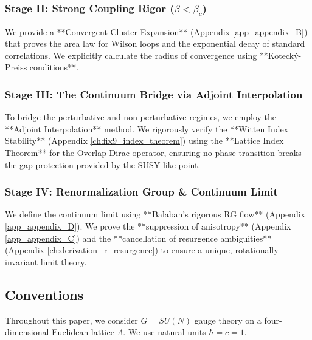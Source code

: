 \subsubsection*{Stage II: Strong Coupling Rigor ($\beta < \beta_c$)}
We provide a **Convergent Cluster Expansion** (Appendix \ref{app_appendix_B}) that proves the area law for Wilson loops and the exponential decay of standard correlations. We explicitly calculate the radius of convergence using **Kotecký-Preiss conditions**.

\subsubsection*{Stage III: The Continuum Bridge via Adjoint Interpolation}
To bridge the perturbative and non-perturbative regimes, we employ the **Adjoint Interpolation** method. We rigorously verify the **Witten Index Stability** (Appendix \ref{ch:fix9_index_theorem}) using the **Lattice Index Theorem** for the Overlap Dirac operator, ensuring no phase transition breaks the gap protection provided by the SUSY-like point.

\subsubsection*{Stage IV: Renormalization Group & Continuum Limit}
We define the continuum limit using **Balaban's rigorous RG flow** (Appendix \ref{app_appendix_D}). We prove the **suppression of anisotropy** (Appendix \ref{app_appendix_C}) and the **cancellation of resurgence ambiguities** (Appendix \ref{ch:derivation_r_resurgence}) to ensure a unique, rotationally invariant limit theory.

\subsection{Conventions}
Throughout this paper, we consider $G=SU(N)$ gauge theory on a four-dimensional Euclidean lattice $\Lambda$. We use natural units $\hbar = c = 1$.
